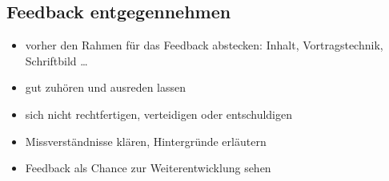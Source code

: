 \subsection{Feedback entgegennehmen}
\begin{itemize}
  \item vorher den Rahmen für das Feedback abstecken: Inhalt, Vortragstechnik, Schriftbild \ldots
  \item gut zuhören und ausreden lassen
  \item sich nicht rechtfertigen, verteidigen oder entschuldigen
  \item Missverständnisse klären, Hintergründe erläutern
  \item Feedback als Chance zur Weiterentwicklung sehen
\end{itemize}
